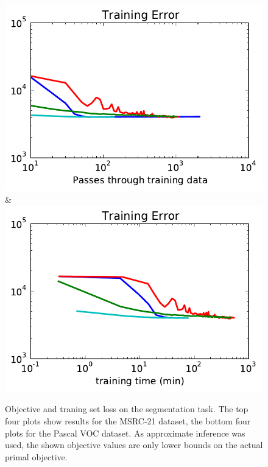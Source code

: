 \begin{figure}
\begin{tabu}
    \includegraphics[width=\linewidth]{evaluation/images/pascal_loss}&%
    \includegraphics[width=\linewidth]{evaluation/images/pascal_time_loss}
    \end{tabu}
\caption{%
    Objective and traning set loss on the segmentation task. The top four plots
    show results for the MSRC-21 dataset, the bottom four plots for the Pascal
    VOC dataset. As approximate inference was used, the shown objective values
    are only lower bounds on the actual primal objective.
}
\end{figure}


